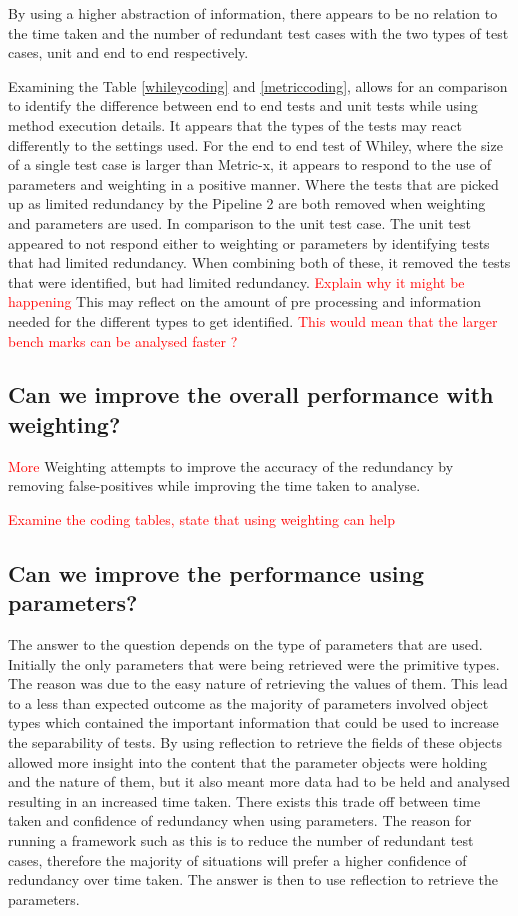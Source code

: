 \documentclass[11pt
              , a4paper
              , twoside
              , openright
              ]{report}
\newcommand\todo[1]{\textcolor{red}{#1}}
\begin{document}
By using a higher abstraction of information, there appears to be no relation to the time taken and the number of redundant test cases with the two types of test cases, unit and end to end respectively.

Examining the Table \ref{whileycoding} and \ref{metriccoding}, allows for an comparison to identify the difference between end to end tests and unit tests while using method execution details. It appears that the types of the tests may react differently to the settings used. For the end to end test of Whiley, where the size of a single test case is larger than Metric-x, it appears to respond to the use of parameters and weighting in a positive manner. Where the tests that are picked up as limited redundancy by the Pipeline 2 are both removed when weighting and parameters are used. In comparison to the unit test case. The unit test appeared to not respond either to weighting or parameters by identifying tests that had limited redundancy. When combining both of these, it removed the tests that were identified, but had limited redundancy. \todo{Explain why it might be happening} This may reflect on the amount of pre processing and information needed for the different types to get identified. \todo{This would mean that the larger bench marks can be analysed faster ?}


\subsection{Can we improve the overall performance with weighting?}
\todo{More}
Weighting attempts to improve the accuracy of the redundancy by removing false-positives while improving the time taken to analyse. 

\todo{Examine the coding tables, state that using weighting can help}

\subsection{Can we improve the performance using parameters?}

The answer to the question depends on the type of parameters that are used. Initially the only parameters that were being retrieved were the primitive types. The reason was due to the easy nature of retrieving the values of them. This lead to a less than expected outcome as the majority of parameters involved object types which contained the important information that could be used to increase the separability of tests. By using reflection to retrieve the fields of these objects allowed more insight into the content that the parameter objects were holding and the nature of them, but it also meant more data had to be held and analysed resulting in an increased time taken. There exists this trade off between time taken and confidence of redundancy when using parameters. The reason for running a framework such as this is to reduce the number of redundant test cases, therefore the majority of situations will prefer a higher confidence of redundancy over time taken. The answer is then to use reflection to retrieve the parameters.
\end{document}
